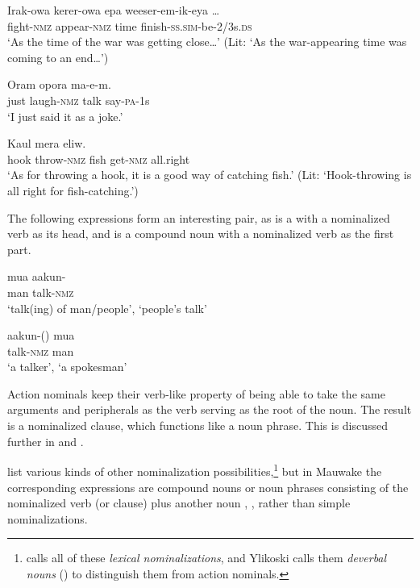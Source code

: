 \ea%
\label{ex:3:x65}
\gll Irak-owa kerer-owa epa weeser-em-ik-eya {\dots}{\upshape\footnotemark} \\
fight-\textsc{nmz} appear-\textsc{nmz} time finish-\textsc{ss}.\textsc{sim}-be-2/3s.\textsc{ds}\\
\glt`As the time of the war was getting close{\dots}' (Lit: `As the war-appearing time was coming to an end{\dots}')
\z 


\ea%
\label{ex:3:x66}
\gll Oram  opora ma-e-m. \\
just laugh-\textsc{nmz} talk say-\textsc{pa}-1s\\
\glt`I just said it as a joke.'
\z

\ea%
\label{ex:3:x67}
\gll Kaul   mera  eliw. \\
hook throw-\textsc{nmz} fish get-\textsc{nmz} all.right\\
\glt`As for throwing a hook, it is a good way of catching fish.' (Lit: `Hook-throwing is all right for fish-catching.') 
\z 

The following expressions form an interesting pair, as  is a  with a nominalized verb as its head, and  is a compound noun with a nominalized verb as the first part.

\ea%
\label{ex:3:x424}
\gll mua aakun- \\
man talk-\textsc{nmz}\\
\glt`talk(ing) of man/people', `people's talk'
\z

\ea%
\label{ex:3:x425}
\gll aakun-() mua \\
talk-\textsc{nmz} man\\
\glt`a talker', `a spokesman'
\z

Action nominals keep their verb-like property of being able to take the same arguments and peripherals as the verb serving as the root of the noun. The result is a nominalized clause, which functions like a noun phrase. This is discussed further in  and .

\citet[334--342]{ComrieEtAl2007} list various kinds of other nominalization possibilities,\footnote{\citet[500]{Givon1990} calls all of these \textit{lexical nominalizations}, and Ylikoski calls them \textit{deverbal nouns} (\citeyear[193]{Ylikoski2003}) to distinguish them from action nominals.} but in Mauwake the corresponding expressions are compound nouns or noun phrases consisting of the nominalized verb (or clause) plus another noun , , rather than simple nominalizations. 

